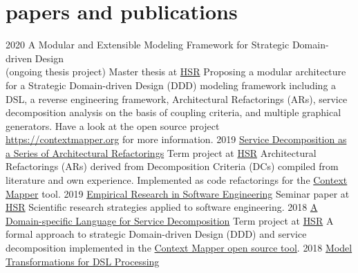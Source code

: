 \documentclass[]{cv-style}
\begin{document}

\section{papers and publications}

\begin{entrylist}
\entry
{2020}
{A Modular and Extensible Modeling Framework for Strategic Domain-driven Design \\(ongoing thesis project)}
{Master thesis at \href{https://www.hsr.ch}{HSR}}
{Proposing a modular architecture for a Strategic Domain-driven Design (DDD) modeling framework including a DSL, a reverse engineering framework, Architectural Refactorings (ARs), service decomposition analysis on the basis of coupling criteria, and multiple graphical generators. Have a look at the open source project \\ \href{https://contextmapper.org}{https://contextmapper.org} for more information.}
\entry
{2019}
{\href{https://eprints.hsr.ch/784/}{Service Decomposition as a Series of Architectural Refactorings}}
{Term project at \href{https://www.hsr.ch}{HSR}}
{Architectural Refactorings (ARs) derived from Decomposition Criteria (DCs) compiled from literature and own experience. Implemented as code refactorings for the \href{https://contextmapper.org/}{Context Mapper} tool.}
\entry
{2019}
{\href{https://github.com/stefan-ka/papers-and-publications/raw/master/empirical-research-in-software-engineering/FS19_SKapferer_Empirical-Research-in-Software-Engineering-Paper.pdf}{Empirical Research in Software Engineering}}
{Seminar paper at \href{https://www.hsr.ch}{HSR}}
{Scientific research strategies applied to software engineering.}
\entry
{2018}
{\href{https://eprints.hsr.ch/722/}{A Domain-specific Language for Service Decomposition}}
{Term project at \href{https://www.hsr.ch}{HSR}}
{A formal approach to strategic Domain-driven Design (DDD) and service decomposition implemented in the \href{https://contextmapper.org/}{Context Mapper open source tool}.}
\entry
{2018}
{\href{https://stefan.kapferer.ch/model-transformations-for-dsl-processing}{Model Transformations for DSL Processing}}

\end{entrylist}
\end{document}
